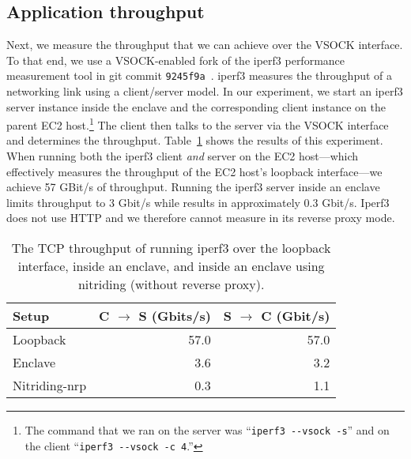 \subsection{Application throughput}%
\label{sec:throughput}

Next, we measure the throughput that we can achieve over the VSOCK interface.
To that end, we use a VSOCK-enabled fork of the iperf3 performance measurement
tool in git commit \texttt{9245f9a}~\cite{iperf-vsock}.  iperf3 measures the
throughput of a networking link using a client/server model.  In our experiment,
we start an iperf3 server instance inside the enclave and the corresponding
client instance on the parent EC2 host.\footnote{The command that we ran on the
server was ``\texttt{iperf3 -{}-vsock -s}'' and on the client ``\texttt{iperf3
-{}-vsock -c 4}.''}  The client then talks to the server via the VSOCK interface
and determines the throughput.  Table~\ref{tab:iperf3} shows the results of this
experiment.  When running both the iperf3 client \emph{and} server on the EC2
host---which effectively measures the throughput of the EC2 host's loopback
interface---we achieve 57 GBit/s of throughput.  Running the iperf3 server
inside an enclave limits throughput to 3 Gbit/s while \tool{} results in
approximately 0.3 Gbit/s.  Iperf3 does not use HTTP and we therefore cannot
measure \tool{} in its reverse proxy mode.

\begin{table}[t]
    \centering
    \begin{tabular}{l r r}
    \toprule
      Setup & C $\rightarrow$ S (Gbits/s) & S $\rightarrow$ C (Gbit/s) \\
    \midrule
      Loopback        & 57.0 & 57.0 \\
      Enclave         &  3.6 &  3.2 \\
      Nitriding-nrp &  0.3 &  1.1 \\
    \bottomrule
    \end{tabular}
    \caption{The TCP throughput of running iperf3 over the
    loopback interface, inside an enclave, and inside an enclave using
    nitriding (without reverse proxy).}%
    \label{tab:iperf3}
\end{table}
